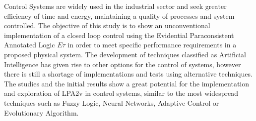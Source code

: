 Control Systems are widely used in the industrial sector and seek greater efficiency of time and energy, maintaining a quality of processes and system controlled.
%
The objective of this study is to show an unconventional implementation of a closed loop control using the Evidential Paraconsistent Annotated Logic $E\tau$ in order to meet specific performance requirements in a proposed physical system.
%
The development of techniques classified as Artificial Intelligence has given rise to other options for the control of systems, however there is still a shortage of implementations and tests using alternative techniques.
%
The studies and the initial results show a great potential for the implementation and exploration of LPA2v in control systems, similar to the most widespread techniques such as Fuzzy Logic, Neural Networks, Adaptive Control or Evolutionary Algorithm.



